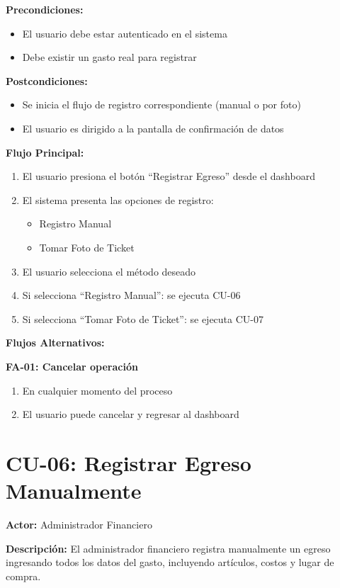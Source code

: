 \noindent\textbf{Precondiciones:}
\begin{itemize}
    \item El usuario debe estar autenticado en el sistema
    \item Debe existir un gasto real para registrar
\end{itemize}

\noindent\textbf{Postcondiciones:}
\begin{itemize}
    \item Se inicia el flujo de registro correspondiente (manual o por foto)
    \item El usuario es dirigido a la pantalla de confirmación de datos
\end{itemize}

\noindent\textbf{Flujo Principal:}
\begin{enumerate}
    \item El usuario presiona el botón ``Registrar Egreso'' desde el dashboard
    \item El sistema presenta las opciones de registro:
    \begin{itemize}
        \item Registro Manual
        \item Tomar Foto de Ticket
    \end{itemize}
    \item El usuario selecciona el método deseado
    \item Si selecciona ``Registro Manual'': se ejecuta CU-06
    \item Si selecciona ``Tomar Foto de Ticket'': se ejecuta CU-07
\end{enumerate}

\noindent\textbf{Flujos Alternativos:}

\textbf{FA-01: Cancelar operación}
\begin{enumerate}
    \item En cualquier momento del proceso
    \item El usuario puede cancelar y regresar al dashboard
\end{enumerate}

\section{CU-06: Registrar Egreso Manualmente}

\noindent\textbf{Actor:} Administrador Financiero

\noindent\textbf{Descripción:} El administrador financiero registra manualmente un egreso ingresando todos los datos del gasto, incluyendo artículos, costos y lugar de compra.

